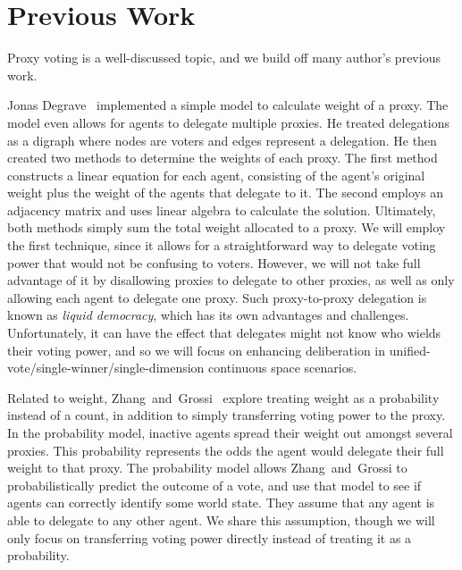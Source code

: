 \section{Previous Work}\label{sec:previous-work}
Proxy voting is a well-discussed topic, and we build off many author's previous work.

Jonas Degrave~\cite{Degrave2014} implemented a simple model to calculate 
weight of a proxy.
The model even allows for agents to delegate multiple proxies.
He treated delegations as a digraph where nodes are voters and edges represent
a delegation.
He then created two methods to determine the weights of each proxy.
The first method constructs a linear equation for each agent, consisting of the
agent's original weight plus the weight of the agents that delegate to it.
The second employs an adjacency matrix and uses linear algebra to calculate the
solution.
Ultimately, both methods simply sum the total weight allocated to a proxy.
We will employ the first technique, since it allows for a straightforward way to
delegate voting power that would not be confusing to voters.
However, we will not take full advantage of it by disallowing proxies to delegate to
other proxies, as well as only allowing each agent to delegate one proxy.
Such proxy-to-proxy delegation is known as \textit{liquid democracy}, which has its own
advantages and challenges.
Unfortunately, it can have the effect that delegates might not know who wields their
voting power, and so we will focus on enhancing deliberation in
unified-vote/single-winner/single-dimension continuous space scenarios.

Related to weight, Zhang~and~Grossi~\cite{Zhang2022} explore treating weight as a
probability instead of a count, in addition to simply transferring voting power to
the proxy.
In the probability model, inactive agents spread their weight out amongst several
proxies.
This probability represents the odds the agent would delegate their full weight to that
proxy.
The probability model allows Zhang~and~Grossi to probabilistically predict the
outcome of a vote, and use that model to see if agents can correctly identify some
world state.
They assume that any agent is able to delegate to any other agent.
We share this assumption, though we will only focus on transferring voting power
directly instead of treating it as a probability.

